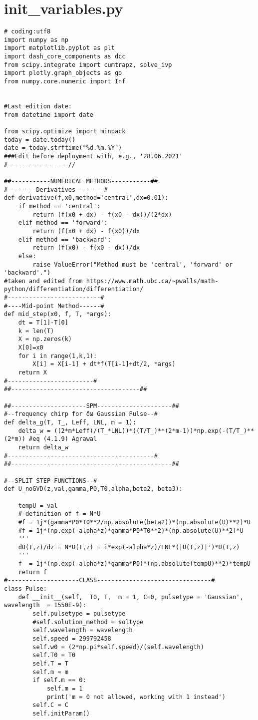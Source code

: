 \section{init\_variables.py}
\label{sec:initvariables}

\begin{verbatim}
# coding:utf8
import numpy as np
import matplotlib.pyplot as plt
import dash_core_components as dcc
from scipy.integrate import cumtrapz, solve_ivp
import plotly.graph_objects as go
from numpy.core.numeric import Inf  


#Last edition date:
from datetime import date

from scipy.optimize import minpack
today = date.today()
date = today.strftime("%d.%m.%Y")
###Edit before deployment with, e.g., '28.06.2021'
#-----------------//

##-----------NUMERICAL METHODS-----------##
#--------Derivatives--------#
def derivative(f,x0,method='central',dx=0.01):
    if method == 'central':
        return (f(x0 + dx) - f(x0 - dx))/(2*dx)
    elif method == 'forward':
        return (f(x0 + dx) - f(x0))/dx
    elif method == 'backward':
        return (f(x0) - f(x0 - dx))/dx
    else:
        raise ValueError("Method must be 'central', 'forward' or 'backward'.") 
#taken and edited from https://www.math.ubc.ca/~pwalls/math-python/differentiation/differentiation/
#--------------------------#
#----Mid-point Method------#
def mid_step(x0, f, T, *args):
    dt = T[1]-T[0]
    k = len(T)
    X = np.zeros(k)
    X[0]=x0
    for i in range(1,k,1):
        X[i] = X[i-1] + dt*f(T[i-1]+dt/2, *args)
    return X
#------------------------#
##------------------------------------##

##---------------------SPM---------------------##
#--frequency chirp for δω Gaussian Pulse--#
def delta_g(T, T_, Leff, LNL, m = 1):
    delta_w = ((2*m*Leff)/(T_*LNL))*((T/T_)**(2*m-1))*np.exp(-(T/T_)**(2*m)) #eq (4.1.9) Agrawal
    return delta_w
#-----------------------------------------#
##---------------------------------------------##

#--SPLIT STEP FUNCTIONS--#
def U_noGVD(z,val,gamma,P0,T0,alpha,beta2, beta3): 
    
    tempU = val
    # definition of f = N*U
    #f = 1j*(gamma*P0*T0**2/np.absolute(beta2))*(np.absolute(U)**2)*U
    #f = 1j*(np.exp(-alpha*z)*gamma*P0*T0**2)*(np.absolute(U)**2)*U
    '''
    dU(T,z)/dz = N*U(T,z) = i*exp(-alpha*z)/LNL*(|U(T,z)|²)*U(T,z)
    '''
    f  = 1j*(np.exp(-alpha*z)*gamma*P0)*(np.absolute(tempU)**2)*tempU
    return f
#--------------------CLASS--------------------------------#
class Pulse:
    def __init__(self,  T0, T,  m = 1, C=0, pulsetype = 'Gaussian', wavelength  = 1550E-9):
        self.pulsetype = pulsetype
        #self.solution_method = soltype
        self.wavelength = wavelength
        self.speed = 299792458
        self.w0 = (2*np.pi*self.speed)/(self.wavelength)
        self.T0 = T0
        self.T = T
        self.m = m
        if self.m == 0:
            self.m = 1
            print('m = 0 not allowed, working with 1 instead')
        self.C = C
        self.initParam()
        

\end{verbatim}
